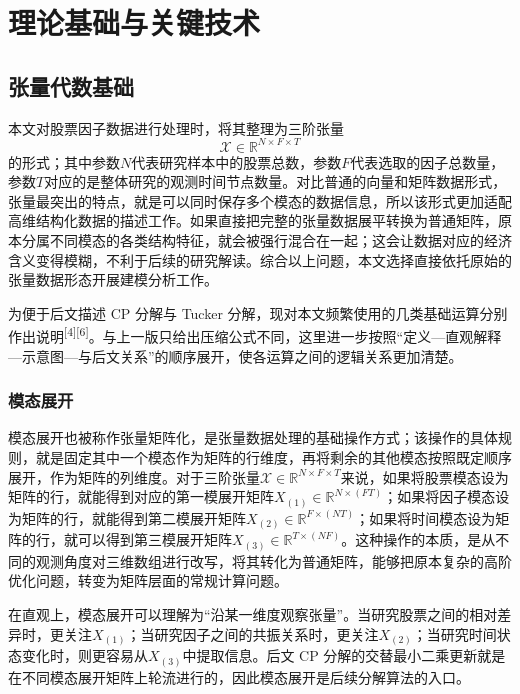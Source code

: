 \chapter{理论基础与关键技术}

\section{张量代数基础}

本文对股票因子数据进行处理时，将其整理为三阶张量$$\mathcal{X}\in\mathbb{R}^{N\times F\times T}$$的形式；其中参数$N$代表研究样本中的股票总数，参数$F$代表选取的因子总数量，参数$T$对应的是整体研究的观测时间节点数量。对比普通的向量和矩阵数据形式，张量最突出的特点，就是可以同时保存多个模态的数据信息，所以该形式更加适配高维结构化数据的描述工作。如果直接把完整的张量数据展平转换为普通矩阵，原本分属不同模态的各类结构特征，就会被强行混合在一起；这会让数据对应的经济含义变得模糊，不利于后续的研究解读。综合以上问题，本文选择直接依托原始的张量数据形态开展建模分析工作。

为便于后文描述 CP 分解与 Tucker 分解，现对本文频繁使用的几类基础运算分别作出说明\textsuperscript{[4][6]}。与上一版只给出压缩公式不同，这里进一步按照“定义—直观解释—示意图—与后文关系”的顺序展开，使各运算之间的逻辑关系更加清楚。

\subsection{模态展开}

模态展开也被称作张量矩阵化，是张量数据处理的基础操作方式；该操作的具体规则，就是固定其中一个模态作为矩阵的行维度，再将剩余的其他模态按照既定顺序展开，作为矩阵的列维度。对于三阶张量$\mathcal{X}\in\mathbb{R}^{N\times F\times T}$来说，如果将股票模态设为矩阵的行，就能得到对应的第一模展开矩阵$X_{(1)}\in\mathbb{R}^{N\times (FT)}$；如果将因子模态设为矩阵的行，就能得到第二模展开矩阵$X_{(2)}\in\mathbb{R}^{F\times (NT)}$；如果将时间模态设为矩阵的行，就可以得到第三模展开矩阵$X_{(3)}\in\mathbb{R}^{T\times (NF)}$。这种操作的本质，是从不同的观测角度对三维数组进行改写，将其转化为普通矩阵，能够把原本复杂的高阶优化问题，转变为矩阵层面的常规计算问题。

在直观上，模态展开可以理解为“沿某一维度观察张量”。当研究股票之间的相对差异时，更关注$X_{(1)}$；当研究因子之间的共振关系时，更关注$X_{(2)}$；当研究时间状态变化时，则更容易从$X_{(3)}$中提取信息。后文 CP 分解的交替最小二乘更新就是在不同模态展开矩阵上轮流进行的，因此模态展开是后续分解算法的入口。

